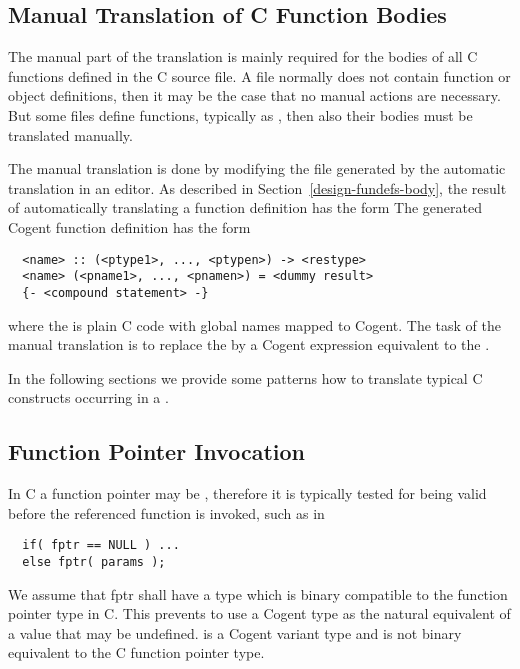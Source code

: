 \subsection{Manual Translation of C Function Bodies}
\label{app-trans-manbody}

The manual part of the translation is mainly required for the bodies of all C functions defined in the C source file.
A  file normally does not contain function or object definitions, then it may be the case that no manual actions 
are necessary. But some  files define functions, typically as , then also their bodies
must be translated manually.

The manual translation is done by modifying the  file generated by the automatic translation in an 
editor. As described in Section~\ref{design-fundefs-body}, the result of automatically translating a function
definition has the form
The generated Cogent function definition has the form
\begin{verbatim}
  <name> :: (<ptype1>, ..., <ptypen>) -> <restype>
  <name> (<pname1>, ..., <pnamen>) = <dummy result>
  {- <compound statement> -}
\end{verbatim}
where the  is plain C code with global names mapped to Cogent. The task of the manual
translation is to replace the  by a Cogent expression equivalent to the .

In the following sections we provide some patterns how to translate typical C constructs occurring in a
.

\subsection{Function Pointer Invocation}
\label{app-trans-funpointer}

In C a function pointer may be , therefore it is typically tested for being valid before the
referenced function is invoked, such as in 
\begin{verbatim}
  if( fptr == NULL ) ...
  else fptr( params );
\end{verbatim}
We assume that fptr shall have a type which is binary compatible to the function pointer type in C.
This prevents to use a Cogent type  as the natural equivalent of a value that may be undefined.
 is a Cogent variant type and is not binary equivalent to the C function pointer type.

